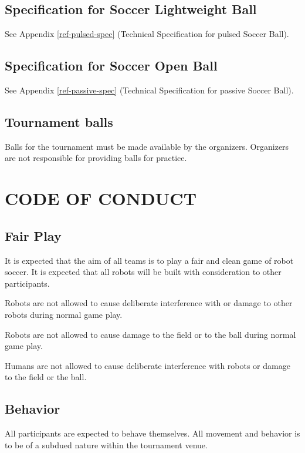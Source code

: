 \documentclass{article}
\begin{document}
\subsection{Specification for Soccer Lightweight Ball}

See Appendix \ref{ref-pulsed-spec} (Technical Specification for pulsed Soccer
Ball).

\subsection{Specification for Soccer Open Ball}

See Appendix \ref{ref-passive-spec} (Technical Specification for passive Soccer
Ball).

\subsection{ Tournament balls \label{ref-039}}

Balls for the tournament must be made available by the organizers. Organizers
are not responsible for providing balls for practice.

\section{CODE OF CONDUCT\label{ref-040}}

\subsection{ Fair Play \label{ref-041}}

It is expected that the aim of all teams is to play a fair and clean game of
robot soccer. It is expected that all robots will be built with consideration
to other participants.

Robots are not allowed to cause deliberate interference with or damage to other
robots during normal game play.

Robots are not allowed to cause damage to the field or to the ball during
normal game play.

Humans are not allowed to cause deliberate interference with robots or damage
to the field or the ball.

\subsection{ Behavior \label{ref-042}}

All participants are expected to behave themselves. All movement and behavior
is to be of a subdued nature within the tournament venue.
\end{document}
